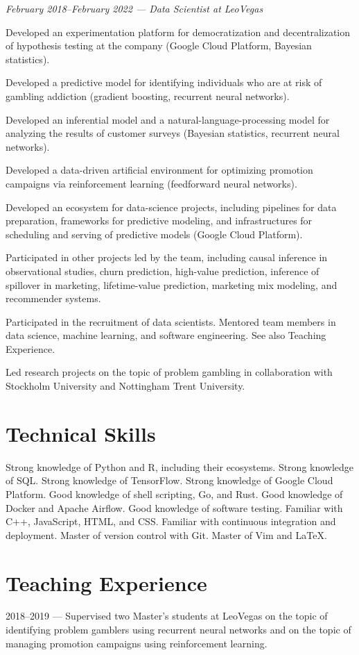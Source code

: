 \documentclass[journal]{IEEEtran}
\begin{document}
\emph{February 2018--February 2022 --- Data Scientist at LeoVegas}

Developed an experimentation platform for democratization and decentralization
of hypothesis testing at the company (Google Cloud Platform, Bayesian
statistics).

Developed a predictive model for identifying individuals who are at risk of
gambling addiction (gradient boosting, recurrent neural networks).

Developed an inferential model and a natural-language-processing model for
analyzing the results of customer surveys (Bayesian statistics, recurrent neural
networks).

Developed a data-driven artificial environment for optimizing promotion
campaigns via reinforcement learning (feedforward neural networks).

Developed an ecosystem for data-science projects, including pipelines for data
preparation, frameworks for predictive modeling, and infrastructures for
scheduling and serving of predictive models (Google Cloud Platform).

Participated in other projects led by the team, including causal inference in
observational studies, churn prediction, high-value prediction, inference of
spillover in marketing, lifetime-value prediction, marketing mix modeling, and
recommender systems.

Participated in the recruitment of data scientists. Mentored team members in
data science, machine learning, and software engineering. See also Teaching
Experience.

Led research projects on the topic of problem gambling in collaboration with
Stockholm University and Nottingham Trent University.

\section{Technical Skills}
Strong knowledge of Python and R, including their ecosystems. Strong knowledge
of SQL. Strong knowledge of TensorFlow. Strong knowledge of Google Cloud
Platform. Good knowledge of shell scripting, Go, and Rust. Good knowledge of
Docker and Apache Airflow. Good knowledge of software testing. Familiar with
C++, JavaScript, HTML, and CSS. Familiar with continuous integration and
deployment. Master of version control with Git. Master of Vim and LaTeX.

\section{Teaching Experience}
2018--2019 --- Supervised two Master's students at LeoVegas on the topic of
identifying problem gamblers using recurrent neural networks and on the topic
of managing promotion campaigns using reinforcement learning.
\end{document}
